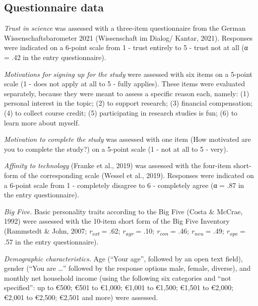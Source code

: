 \documentclass[authordate, empirical,issue]{jote-new-article}
\begin{document}
\subsection{Questionnaire data}



\emph{Trust in science} was assessed with a three-item questionnaire from the German Wissenschaftsbarometer 2021 (Wissenschaft im Dialog/ Kantar, 2021). Responses were indicated on a 6-point scale from 1 - trust entirely to 5 - trust not at all (α = .42 in the entry questionnaire).



\emph{Motivations for signing up for the study }were assessed with six items on a 5-point scale (1 - does not apply at all to 5 - fully applies). These items were evaluated separately, because they were meant to assess a specific reason each, namely: (1) personal interest in the topic; (2) to support research; (3) financial compensation; (4) to collect course credit; (5) participating in research studies is fun; (6) to learn more about myself.



\emph{Motivation to complete the study }was assessed with one item (How motivated are you to complete the study?) on a 5-point scale (1 - not at all to 5 - very).



\emph{Affinity to technology} (Franke et al., 2019) was assessed with the four-item short-form of the corresponding scale (Wessel et al., 2019). Responses were indicated on a 6-point scale from 1 - completely disagree to 6 - completely agree (α = .87 in the entry questionnaire).



\emph{Big Five. }Basic personality traits according to the Big Five (Costa \& McCrae, 1992) were assessed with the 10-item short form of the Big Five Inventory (Rammstedt \& John, 2007;\emph{ r}\textsubscript{\emph{ext}} = .62;\emph{ r}\textsubscript{\emph{agr}} = .10; \emph{r}\textsubscript{\emph{con}} = .46;\emph{ r}\textsubscript{\emph{neu}} = .49;\emph{ r}\textsubscript{\emph{ope}} = .57 in the entry questionnaire).



\emph{Demographic characteristics.} Age (“Your age”, followed by an open text field), gender (“You are …” followed by the response options male, female, diverse), and monthly net household income (using the following six categories and “not specified”: up to €500; €501 to €1,000; €1,001 to €1,500; €1,501 to €2,000; €2,001 to €2,500; €2,501 and more) were assessed.
\end{document}
